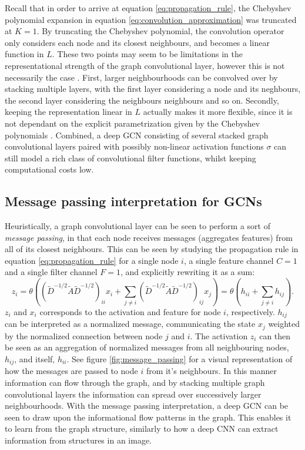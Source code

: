Recall that in order to arrive at equation \eqref{eq:propagation_rule}, the Chebyshev polynomial expansion in equation \eqref{eq:convolution_approximation} was truncated at $K=1$. By truncating the Chebyshev polynomial, the convolution operator only considers each node and its closest neighbours, and becomes a linear function in $L$. These two points may seem to be limitations in the representational strength of the graph convolutional layer, however this is not necessarily the case \cite{kipf_semi_supervised}. First, larger neighbourhoods can be convolved over by stacking multiple layers, with the first layer considering a node and its neghbours, the second layer considering the neighbours neighbours and so on. Secondly, keeping the representation linear in $L$ actually makes it more flexible, since it is not dependant on the explicit parametrization given by the Chebyshev polynomials \cite{kipf_semi_supervised}. Combined, a deep GCN consisting of several stacked graph convolutional layers paired with possibly non-linear activation functions $\sigma$ can still model a rich class of convolutional filter functions, whilst keeping computational costs low. 


\subsection{Message passing interpretation for GCNs}
\label{subsec:message_passing}

Heuristically, a graph convolutional layer can be seen to perform a sort of \textit{message passing}, in that each node receives messages (aggregates features) from all of its closest neighbours. This can be seen by studying the propagation rule in equation \eqref{eq:propagation_rule} for a single node $i$, a single feature channel $C=1$ and a single filter channel $F=1$, and explicitly rewriting it as a sum:
\begin{equation}
    z_i = \theta \left(\left(\tilde{D}^{-1/2} \tilde{A} \tilde{D}^{-1/2}\right)_{ii} x_{i} + \sum_{j \neq i} \left(\tilde{D}^{-1/2} \tilde{A} \tilde{D}^{-1/2}\right)_{ij} x_{j} \right) = \theta \left(h_{ii} + \sum_{j \neq i} h_{ij} \right).
\end{equation}
$z_i$ and $x_i$ corresponds to the activation and feature for node $i$, respectively. $h_{ij}$ can be interpreted as a normalized message, communicating the state $x_j$ weighted by the normalized connection between node $j$ and $i$. The activation $z_i$ can then be seen as an aggregation of normalized messages from all neighbouring nodes, $h_{ij}$, and itself, $h_{ii}$. See figure \ref{fig:message_passing} for a visual representation of how the messages are passed to node $i$ from it's neighbours. In this manner information can flow through the graph, and by stacking multiple graph convolutional layers the information can spread over successively larger neighbourhoods. With the message passing interpretation, a deep GCN can be seen to draw upon the informational flow patterns in the graph. This enables it to learn from the graph structure, similarly to how a deep CNN can extract information from structures in an image.

